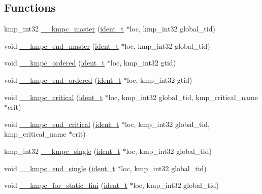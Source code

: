 \subsection*{Functions}
\begin{DoxyCompactItemize}
\item 
kmp\-\_\-int32 \hyperlink{group__WORK__SHARING_ga721f06c8017479ccc6cb46ae0552b597}{\-\_\-\-\_\-kmpc\-\_\-master} (\hyperlink{group__BASIC__TYPES_ga690fda6b92f039a72db263c6b4394ddb}{ident\-\_\-t} $\ast$loc, kmp\-\_\-int32 global\-\_\-tid)
\item 
void \hyperlink{group__WORK__SHARING_gaa290fe71698081e26ec234a234d2fdcc}{\-\_\-\-\_\-kmpc\-\_\-end\-\_\-master} (\hyperlink{group__BASIC__TYPES_ga690fda6b92f039a72db263c6b4394ddb}{ident\-\_\-t} $\ast$loc, kmp\-\_\-int32 global\-\_\-tid)
\item 
void \hyperlink{group__WORK__SHARING_gada4a8fc8b0a17d3109acdeaf2c9443ea}{\-\_\-\-\_\-kmpc\-\_\-ordered} (\hyperlink{group__BASIC__TYPES_ga690fda6b92f039a72db263c6b4394ddb}{ident\-\_\-t} $\ast$loc, kmp\-\_\-int32 gtid)
\item 
void \hyperlink{group__WORK__SHARING_ga06dfab09153c455fcaa609e97846b0d5}{\-\_\-\-\_\-kmpc\-\_\-end\-\_\-ordered} (\hyperlink{group__BASIC__TYPES_ga690fda6b92f039a72db263c6b4394ddb}{ident\-\_\-t} $\ast$loc, kmp\-\_\-int32 gtid)
\item 
void \hyperlink{group__WORK__SHARING_gafc4e7d07089576fe946c42777ef191cc}{\-\_\-\-\_\-kmpc\-\_\-critical} (\hyperlink{group__BASIC__TYPES_ga690fda6b92f039a72db263c6b4394ddb}{ident\-\_\-t} $\ast$loc, kmp\-\_\-int32 global\-\_\-tid, kmp\-\_\-critical\-\_\-name $\ast$crit)
\item 
void \hyperlink{group__WORK__SHARING_ga134f0e9d82a69403d9e167dbbf7ae731}{\-\_\-\-\_\-kmpc\-\_\-end\-\_\-critical} (\hyperlink{group__BASIC__TYPES_ga690fda6b92f039a72db263c6b4394ddb}{ident\-\_\-t} $\ast$loc, kmp\-\_\-int32 global\-\_\-tid, kmp\-\_\-critical\-\_\-name $\ast$crit)
\item 
kmp\-\_\-int32 \hyperlink{group__WORK__SHARING_ga794e820b3c076c766cef93bb414908cc}{\-\_\-\-\_\-kmpc\-\_\-single} (\hyperlink{group__BASIC__TYPES_ga690fda6b92f039a72db263c6b4394ddb}{ident\-\_\-t} $\ast$loc, kmp\-\_\-int32 global\-\_\-tid)
\item 
void \hyperlink{group__WORK__SHARING_gaa7d615b194c12278b00841852b0dff2b}{\-\_\-\-\_\-kmpc\-\_\-end\-\_\-single} (\hyperlink{group__BASIC__TYPES_ga690fda6b92f039a72db263c6b4394ddb}{ident\-\_\-t} $\ast$loc, kmp\-\_\-int32 global\-\_\-tid)
\item 
void \hyperlink{group__WORK__SHARING_ga4bec24e63a011cc0bfca98e79f3c0b93}{\-\_\-\-\_\-kmpc\-\_\-for\-\_\-static\-\_\-fini} (\hyperlink{group__BASIC__TYPES_ga690fda6b92f039a72db263c6b4394ddb}{ident\-\_\-t} $\ast$loc, kmp\-\_\-int32 global\-\_\-tid)
\end{DoxyCompactItemize}
